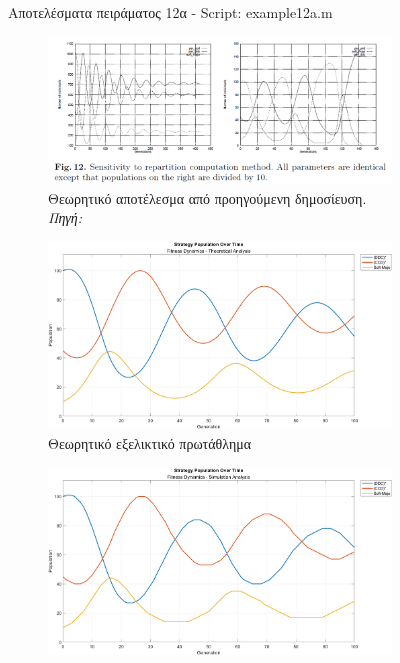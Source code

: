 \documentclass[12pt]{report}
\begin{document}
\begin{figure}[H]
\begin{subfigure}[b]{0.5\linewidth}
    \end{subfigure}

    \caption{Αποτελέσματα πειράματος 12α - \foreignlanguage{english}{Script: example12a.m}}
    \label{fig:fig_fit_12a}
\end{figure}

\begin{figure}[H]
    \centering

    \begin{subfigure}[b]{0.5\linewidth}
    \centering
    \includegraphics[width=\linewidth]{Figures Fitness Dynamics/12.png}
    \caption{Θεωρητικό αποτέλεσμα από προηγούμενη δημοσίευση. \textit{Πηγή:} \protect\cite{mathieu1999}}
    \end{subfigure}
    \hfill
    \begin{subfigure}[b]{0.5\linewidth}
        \centering
        \includegraphics[width=\linewidth]{Figures Fitness Dynamics/example12b.png}
        \caption{Θεωρητικό εξελικτικό πρωτάθλημα}
        \label{fig:fig_fit_12b_b}
    \end{subfigure}
    \hfill
    \begin{subfigure}[b]{0.5\linewidth}
        \centering
        \includegraphics[width=\linewidth]{Figures Fitness Dynamics/example12b-sim.png}

\end{subfigure}
\end{figure}
\end{document}
